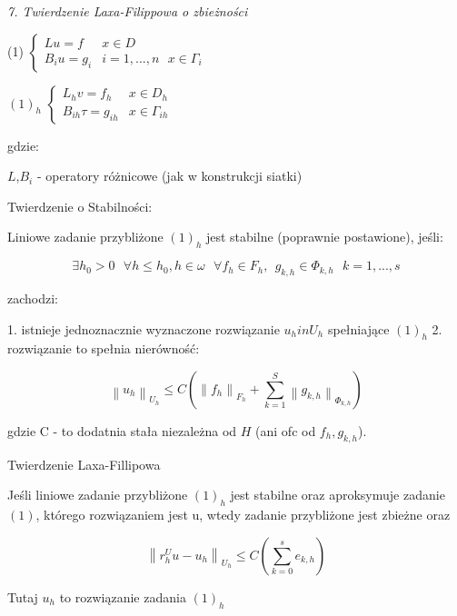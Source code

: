 \textit{7. Twierdzenie Laxa-Filippowa o zbieżności}

(1) $\left\{\begin{matrix} Lu = f & x \in D \\ B_iu = g_i & i = 1,...,n\ \ \ x \in \Gamma _i \end{matrix}\right.$

$(1)_h$ $\left\{\begin{matrix} L_hv = f_h & x \in D_h \\ B_{ih} \tau = g_{ih} & x \in \Gamma _{ih} \end{matrix}\right.$

gdzie:

$L$,$B_i$ - operatory różnicowe (jak w konstrukcji siatki)

Twierdzenie o Stabilności:

Liniowe zadanie przybliżone $(1)_h$ jest stabilne (poprawnie postawione), jeśli:

\[ \exists h_0 > 0 \ \ \ \forall h \leqslant h_0 , h \in \omega \ \ \ \forall f_h \in F_h,\ \  g_{k,h} \in \Phi _{k,h}\ \ \ k = 1,...,s\]

zachodzi:

1. istnieje jednoznacznie wyznaczone rozwiązanie $u_h in U_h$ spełniające $(1)_h$
2. rozwiązanie to spełnia nierówność:

\[ \left \| u_h \right  \|_{U_h} \leqslant C(\left \| f_h \right \|_{F_h} + \sum_{k=1}^S \left \| g_{k,h} \right \|_{\Phi _{k,h}}) \]

gdzie C - to dodatnia stała niezależna od $H$ (ani ofc od $f_h, g_{k,h}$).

Twierdzenie Laxa-Fillipowa

Jeśli liniowe zadanie przybliżone $(1)_h$ jest stabilne oraz aproksymuje zadanie $(1)$, którego rozwiązaniem jest u, wtedy zadanie przybliżone jest zbieżne oraz

\[ \left \| r_h^U u - u_h \right \|_{U_h} \leqslant C(\sum_{k=0}^{s} e_{k,h}) \]

Tutaj $u_h$ to rozwiązanie zadania $(1)_h$